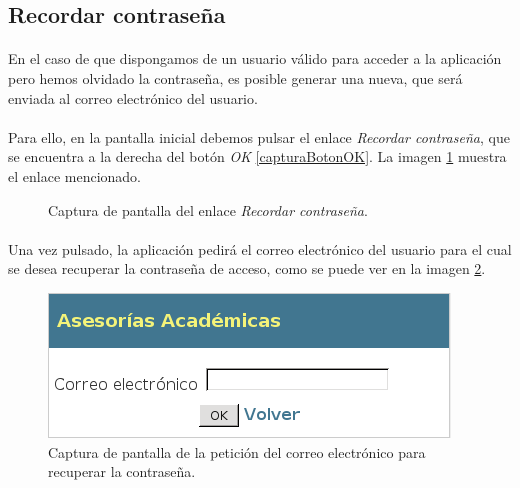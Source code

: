 \subsection{Recordar contraseña}

  \paragraph{}En el caso de que dispongamos de un usuario válido para acceder a
  la aplicación pero hemos olvidado la contraseña, es posible generar una nueva,
  que será enviada al correo electrónico del usuario.

  \paragraph{}Para ello, en la pantalla inicial debemos pulsar el enlace
  \textit{Recordar contraseña}, que se encuentra a la derecha del botón
  \textit{OK} \ref{capturaBotonOK}. La imagen \ref{capturaRecordarPassword}
  muestra el enlace mencionado.

  \begin{figure}[!ht]
    \begin{center}
      \caption{Captura de pantalla del enlace \textit{Recordar contraseña}.}
      \label{capturaRecordarPassword}
    \end{center}
  \end{figure}

  \paragraph{}Una vez pulsado, la aplicación pedirá el correo electrónico del
  usuario para el cual se desea recuperar la contraseña de acceso, como se puede
  ver en la imagen \ref{capturaPedirCorreo}.

  \begin{figure}[!ht]
    \begin{center}
      \includegraphics[scale=0.6]{4.Funcionamiento_Aplicacion/4.2.Acceso_Sistema/4.2.1.Recordar_Password/Capturas/pedir_correo.png}
      \caption{Captura de pantalla de la petición del correo electrónico para recuperar la contraseña.}
      \label{capturaPedirCorreo}
    \end{center}
  \end{figure}

